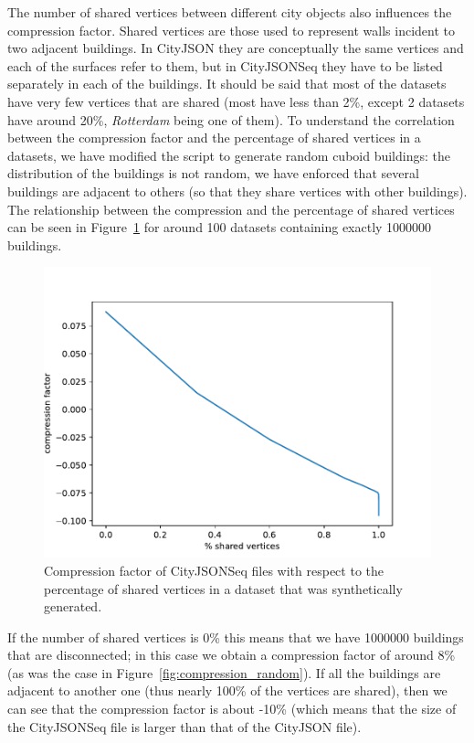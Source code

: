 \documentclass{isprs} %
\begin{document}
The number of shared vertices between different city objects also influences the compression factor. 
Shared vertices are those used to represent walls incident to two adjacent buildings.
In CityJSON they are conceptually the same vertices and each of the surfaces refer to them, but in CityJSONSeq they have to be listed separately in each of the buildings.
It should be said that most of the datasets have very few vertices that are shared (most have less than 2\%, except 2 datasets have around 20\%, \emph{Rotterdam} being one of them).
To understand the correlation between the compression factor and the percentage of shared vertices in a datasets, we have modified the script to generate random cuboid buildings: the distribution of the buildings is not random, we have enforced that several buildings are adjacent to others (so that they share vertices with other buildings).
The relationship between the compression and the percentage of shared vertices can be seen in Figure~\ref{fig:compression_adjacent} for around 100 datasets containing exactly \num{1000000} buildings.
\begin{figure}
  \centering
  \includegraphics[width=\linewidth]{figs/compression_adjacent.pdf}
  \caption{Compression factor of CityJSONSeq files with respect to the percentage of shared vertices in a dataset that was synthetically generated.}%
\label{fig:compression_adjacent}
\end{figure}
If the number of shared vertices is 0\% this means that we have \num{1000000} buildings that are disconnected; in this case we obtain a compression factor of around 8\% (as was the case in Figure~\ref{fig:compression_random}).
If all the buildings are adjacent to another one (thus nearly 100\% of the vertices are shared), then we can see that the compression factor is about -10\% (which means that the size of the CityJSONSeq file is larger than that of the CityJSON file).
%
\end{document}
